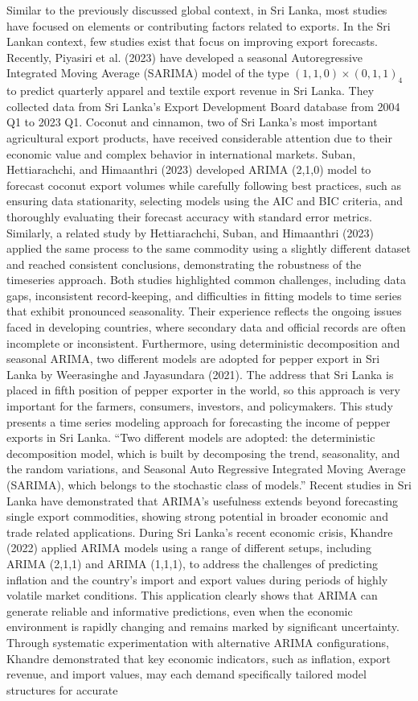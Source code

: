 \documentclass[12pt,a4paper]{report} %
\begin{document}
	Similar to the previously discussed global context, in Sri Lanka, most studies have focused on elements or contributing factors related to exports. In the Sri Lankan context, few studies exist that focus on improving export forecasts. Recently, Piyasiri et al. (2023) have developed a seasonal Autoregressive Integrated Moving Average (SARIMA) model of the type $(1,1,0)\times(0,1,1)_{4}$ to predict quarterly apparel and textile export revenue in Sri Lanka. They collected data from Sri Lanka’s Export Development Board database from 2004 Q1 to 2023 Q1. Coconut and cinnamon, two of Sri Lanka’s most important agricultural export products, have received considerable attention due to their economic value and complex behavior in international markets. Suban, Hettiarachchi, and Himaanthri (2023) developed ARIMA (2,1,0) model to forecast coconut export volumes while carefully following best practices, such as ensuring data stationarity, selecting models using the AIC and BIC criteria, and thoroughly evaluating their forecast accuracy with standard error metrics. Similarly, a related study by Hettiarachchi, Suban, and Himaanthri (2023) applied the same process to the same commodity using a slightly different dataset and reached consistent conclusions, demonstrating the robustness of the timeseries approach. Both studies highlighted common challenges, including data gaps, inconsistent record-keeping, and difficulties in fitting models to time series that exhibit pronounced seasonality. Their experience reflects the ongoing issues faced in developing countries, where secondary data and official records are often incomplete or inconsistent. Furthermore, using deterministic decomposition and seasonal ARIMA, two different models are adopted for pepper export in Sri Lanka by Weerasinghe and Jayasundara (2021). The address that Sri Lanka is placed in fifth position of pepper exporter in the world, so this approach is very important for the farmers, consumers, investors, and policymakers. This study presents a time series modeling approach for forecasting the income of pepper exports in Sri Lanka. ``Two different models are adopted: the deterministic decomposition model, which is built by decomposing the trend, seasonality, and the random variations, and Seasonal Auto Regressive Integrated Moving Average (SARIMA), which belongs to the stochastic class of models.'' Recent studies in Sri Lanka have demonstrated that ARIMA’s usefulness extends beyond forecasting single export commodities, showing strong potential in broader economic and trade related applications. During Sri Lanka's recent economic crisis, Khandre (2022) applied ARIMA models using a range of different setups, including ARIMA (2,1,1) and ARIMA (1,1,1), to address the challenges of predicting inflation and the country’s import and export values during periods of highly volatile market conditions. This application clearly shows that ARIMA can generate reliable and informative predictions, even when the economic environment is rapidly changing and remains marked by significant uncertainty. Through systematic experimentation with alternative ARIMA configurations, Khandre demonstrated that key economic indicators, such as inflation, export revenue, and import values, may each demand specifically tailored model structures for accurate 
\end{document}
